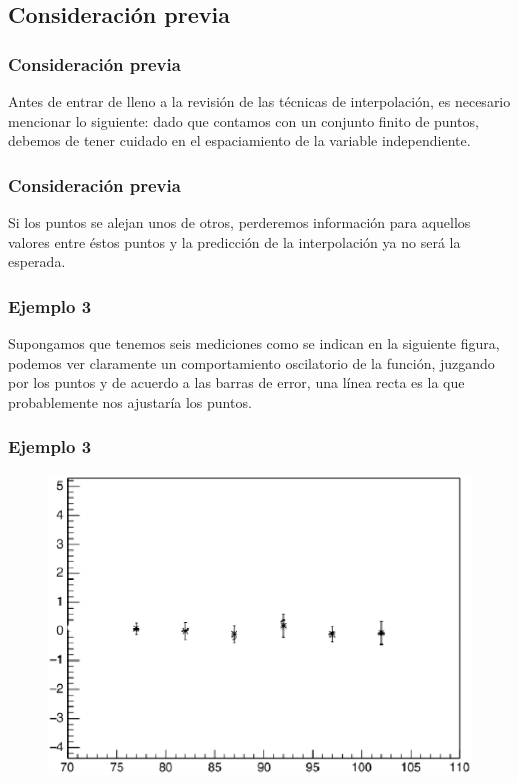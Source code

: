 \documentclass[12pt]{beamer}
\begin{document}
\subsection{Consideración previa}

\begin{frame}
\frametitle{Consideración previa}
Antes de entrar de lleno a la revisión de las técnicas de interpolación, es necesario mencionar lo siguiente: dado que contamos con un conjunto finito de puntos, debemos de tener cuidado en el espaciamiento de la variable independiente.
\end{frame}
\begin{frame}
\frametitle{Consideración previa}
Si los puntos se alejan unos de otros, perderemos información para aquellos valores entre éstos puntos y la predicción de la interpolación ya no será la esperada.
\end{frame}
\begin{frame}
\frametitle{Ejemplo 3}
Supongamos que tenemos seis mediciones como se indican en la siguiente figura, podemos ver claramente un comportamiento oscilatorio de la función, juzgando por los puntos y de acuerdo a las barras de error, una línea recta es la que probablemente nos ajustaría los puntos.
\end{frame}
\begin{frame}
\frametitle{Ejemplo 3}
\begin{figure}
	\centering
	\includegraphics[scale=0.6]{Imagenes/figura01-1.eps} 
\end{figure}
\end{frame}
\end{document}
